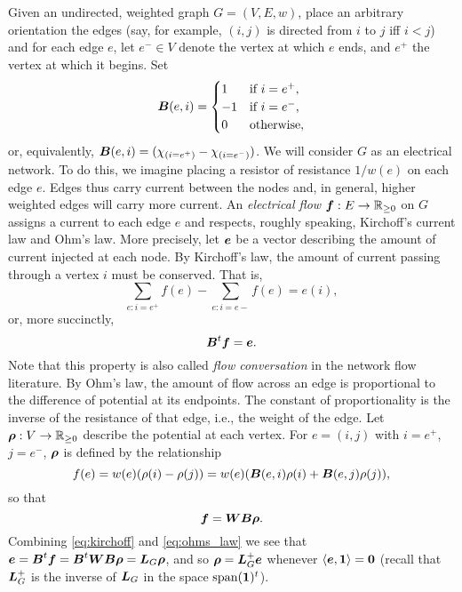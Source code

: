 Given an undirected, weighted graph $G=(V,E,w)$, 
place an arbitrary orientation the edges (say, for example, $(i,j)$ is directed from $i$ to $j$ iff $i<j$) and for each edge $e$, let $e^-\in V$ denote the vertex at which $e$ ends, and $e^+$ the vertex at which it  begins. Set 
\begin{equation}
\label{eq:B_G}
\vb*{B}(e,i)=\begin{cases}
1&\text{if }i=e^+,\\
-1&\text{if }i=e^-,\\
0&\text{otherwise},
\end{cases}
\end{equation}
or, equivalently, $\vb*{B}(e,i) = (\chi_{(i=e^+)}-\chi_{(i=e^-)})$.
We will consider $G$ as an electrical network. To do this, we imagine placing a resistor of resistance $1/w(e)$ on each edge $e$. Edges thus carry current between the nodes and, in general, higher weighted edges will carry more current.  
An \emph{electrical flow $\vb*{f}:E\to\mathbb{R}_{\geq 0}$} on $G$ assigns a current to each edge $e$ and respects, roughly speaking, Kirchoff's current law and Ohm's law. More precisely, let $\vb*{e}$ be a vector describing the amount of current injected at each node. By Kirchoff's law, the amount of current passing through a vertex $i$ must be conserved. That is, 
\[\sum_{e:i=e^+}f(e) - \sum_{e:i=e-}f(e) = e(i),\]
or, more succinctly, 
\begin{equation}
\label{eq:kirchoff}
\vb*{B}^t \vb*{f}=\vb*{e}. 
\end{equation}
Note that this property is also called \emph{flow conversation} in the network flow literature. 
By Ohm's law, the amount of flow across an edge is proportional to the difference of potential at its endpoints. The constant of proportionality is the inverse of the resistance of that edge, i.e., the weight of the edge. Let $\vb*{\rho}:V\to\mathbb{R}_{\geq 0}$ describe the potential at each vertex. For $e=(i,j)$ with $i=e^+$, $j=e^-$, $\vb*{\rho}$ is defined by the relationship 
\begin{equation*}
f(e) = w(e)(\rho(i)-\rho(j)) = w(e) (\vb*{B}(e,i)\rho(i) + \vb*{B}(e,j)\rho(j)),
\end{equation*}
so that
\begin{equation}
\label{eq:ohms_law}
\vb*{f}=\vb*{W}\vb*{B}\vb*{\rho}.
\end{equation}
Combining \eqref{eq:kirchoff} and \eqref{eq:ohms_law} we see that $\vb*{e}=\vb*{B}^t \vb*{f}=\vb*{B}^t \vb*{W}\vb*{B} \vb*{\rho} = \vb*{L}_G\vb*{\rho}$, and so $\vb*{\rho} = \vb*{L}_G^+\vb*{e}$ whenever $\langle \vb*{e},\vb{1}\rangle=\vb{0}$ (recall that $\vb*{L}_G^+$ is the inverse of $\vb*{L}_G$ in the space $\textnormal{span}(\vb{1})^t$).  

